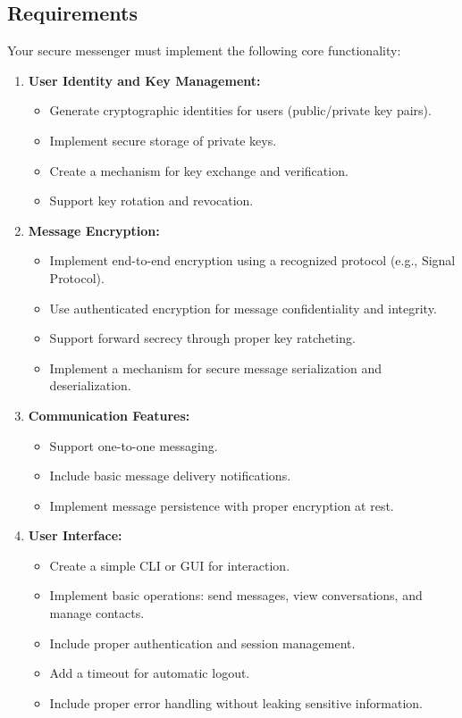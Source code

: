 \documentclass[10pt,a4paper,american]{exam}
\begin{document}
\subsection*{Requirements}
Your secure messenger must implement the following core functionality:

\begin{enumerate}
	\item \textbf{User Identity and Key Management:}
	      \begin{itemize}
		      \item Generate cryptographic identities for users (public/private key pairs).
		      \item Implement secure storage of private keys.
		      \item Create a mechanism for key exchange and verification.
		      \item Support key rotation and revocation.
	      \end{itemize}

	\item \textbf{Message Encryption:}
	      \begin{itemize}
		      \item Implement end-to-end encryption using a recognized protocol (e.g., Signal Protocol).
		      \item Use authenticated encryption for message confidentiality and integrity.
		      \item Support forward secrecy through proper key ratcheting.
		      \item Implement a mechanism for secure message serialization and deserialization.
	      \end{itemize}

	\item \textbf{Communication Features:}
	      \begin{itemize}
		      \item Support one-to-one messaging.
		      \item Include basic message delivery notifications.
		      \item Implement message persistence with proper encryption at rest.
	      \end{itemize}

	\item \textbf{User Interface:}
	      \begin{itemize}
		      \item Create a simple CLI or GUI for interaction.
		      \item Implement basic operations: send messages, view conversations, and manage contacts.
		      \item Include proper authentication and session management.
		      \item Add a timeout for automatic logout.
		      \item Include proper error handling without leaking sensitive information.
	      \end{itemize}
\end{enumerate}
\end{document}
